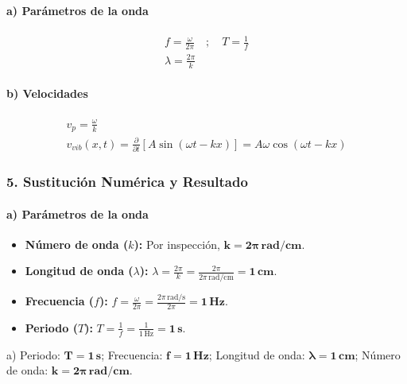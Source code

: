 \paragraph{a) Parámetros de la onda}
\begin{gather}
    f = \frac{\omega}{2\pi} \quad ; \quad T = \frac{1}{f} \\
    \lambda = \frac{2\pi}{k}
\end{gather}
\paragraph{b) Velocidades}
\begin{gather}
    v_p = \frac{\omega}{k} \\
    v_{vib}(x,t) = \frac{\partial}{\partial t}[A\sin(\omega t - kx)] = A\omega\cos(\omega t - kx)
\end{gather}

\subsubsection*{5. Sustitución Numérica y Resultado}
\paragraph{a) Parámetros de la onda}
\begin{itemize}
    \item \textbf{Número de onda ($k$):} Por inspección, $\boldsymbol{k = 2\pi\,\textbf{rad/cm}}$.
    \item \textbf{Longitud de onda ($\lambda$):} $\lambda = \frac{2\pi}{k} = \frac{2\pi}{2\pi\,\text{rad/cm}} = \boldsymbol{1\,\textbf{cm}}$.
    \item \textbf{Frecuencia ($f$):} $f = \frac{\omega}{2\pi} = \frac{2\pi\,\text{rad/s}}{2\pi} = \boldsymbol{1\,\textbf{Hz}}$.
    \item \textbf{Periodo ($T$):} $T = \frac{1}{f} = \frac{1}{1\,\text{Hz}} = \boldsymbol{1\,\textbf{s}}$.
\end{itemize}
\begin{cajaresultado}
a) Periodo: $\boldsymbol{T=1\,\textbf{s}}$; Frecuencia: $\boldsymbol{f=1\,\textbf{Hz}}$; Longitud de onda: $\boldsymbol{\lambda=1\,\textbf{cm}}$; Número de onda: $\boldsymbol{k=2\pi\,\textbf{rad/cm}}$.
\end{cajaresultado}

